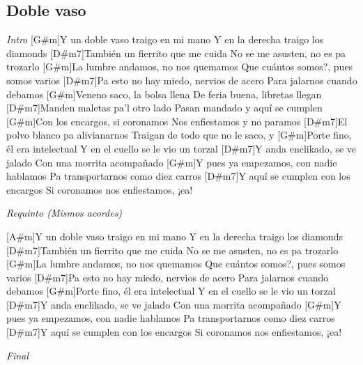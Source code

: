 \subsection{Doble vaso}

\noindent
\vspace{1cm}

\begin{guitar}
	\begin{multicols}{2}

		\textit{Intro}
		[G#m]Y un doble vaso traigo en mi mano
		Y en la derecha traigo los diamonds
		[D#m7]Tambi\'en un fierrito que me cuida
		No se me asusten, no es pa trozarlo
		[G#m]La lumbre andamos, no nos quemamos
		Que cu\'antos somos?, pues somos varios
		[D#m7]Pa esto no hay miedo, nervios de acero
		Para jalarnos cuando debamos
		[G#m]Veneno saco, la bolsa llena
		De feria buena, libretas llegan
		[D#m7]Manden maletas pa'l otro lado
		Pasan mandado y aqu\'i se cumplen
		[G#m]Con los encargos, si coronamos
		Nos enfiestamos y no paramos
		[D#m7]El polvo blanco pa alivianarnos
		Traigan de todo que no le saco, y
		[G#m]Porte fino, \'el era intelectual
		Y en el cuello se le vio un torzal
		[D#m7]Y anda enclikado, se ve jalado
		Con una morrita acompa\~{n}ado
		[G#m]Y pues ya empezamos, con nadie hablamos
		Pa transportarnos como diez carros
		[D#m7]Y aqu\'i se cumplen con los encargos
		Si coronamos nos enfiestamos, ¡ea!

		\textit{Requinto (Mismos acordes)}

		[A#m]Y un doble vaso traigo en mi mano
		Y en la derecha traigo los diamonds
		[D#m7]Tambi\'en un fierrito que me cuida
		No se me asusten, no es pa trozarlo
		[G#m]La lumbre andamos, no nos quemamos
		Que cu\'antos somos?, pues somos varios
		[D#m7]Pa esto no hay miedo, nervios de acero
		Para jalarnos cuando debamos
		[G#m]Porte fino, \'el era intelectual
		Y en el cuello se le vio un torzal
		[D#m7]Y anda enclikado, se ve jalado
		Con una morrita acompa\~{n}ado
		[G#m]Y pues ya empezamos, con nadie hablamos
		Pa transportarnos como diez carros
		[D#m7]Y aqu\'i se cumplen con los encargos
		Si coronamos nos enfiestamos, ¡ea!

		\textit{Final}

	\end{multicols}
\end{guitar}
